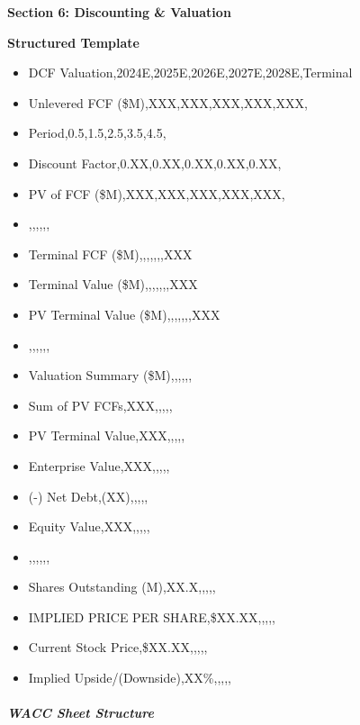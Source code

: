 \documentclass[11pt]{article}
\begin{document}
\textbf{Section 6: Discounting \& Valuation}

\textbf{Structured Template}
\begin{itemize}[leftmargin=*,itemsep=2pt,topsep=2pt]
\item {} DCF Valuation,2024E,2025E,2026E,2027E,2028E,Terminal
\item {} Unlevered FCF (\$M),XXX,XXX,XXX,XXX,XXX,
\item {} Period,0.5,1.5,2.5,3.5,4.5,
\item {} Discount Factor,0.XX,0.XX,0.XX,0.XX,0.XX,
\item {} PV of FCF (\$M),XXX,XXX,XXX,XXX,XXX,
\item {} ,,,,,,
\item {} Terminal FCF (\$M),,,,,,,XXX
\item {} Terminal Value (\$M),,,,,,,XXX
\item {} PV Terminal Value (\$M),,,,,,,XXX
\item {} ,,,,,,
\item {} Valuation Summary (\$M),,,,,,
\item {} Sum of PV FCFs,XXX,,,,,
\item {} PV Terminal Value,XXX,,,,,
\item {} Enterprise Value,XXX,,,,,
\item {} (-) Net Debt,(XX),,,,,
\item {} Equity Value,XXX,,,,,
\item {} ,,,,,,
\item {} Shares Outstanding (M),XX.X,,,,,
\item {} IMPLIED PRICE PER SHARE,\$XX.XX,,,,,
\item {} Current Stock Price,\$XX.XX,,,,,
\item {} Implied Upside/(Downside),XX\%,,,,,
\end{itemize}

\subparagraph{WACC Sheet Structure}\mbox{}\par
\end{document}
